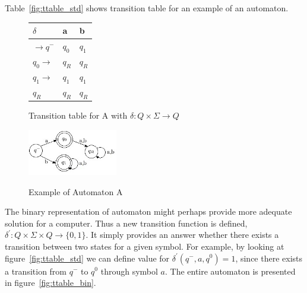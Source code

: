\documentclass{article}
\begin{document}
Table~\ref{fig:ttable_std} shows transition table for an example of an automaton.

%
%
\begin{figure}
\CenterFloatBoxes
\begin{floatrow}

\ttabbox
  {
  \centering
  \setlength{\tabcolsep}{15pt}
	\renewcommand{\arraystretch}{1.5}
	\begin{tabular}{|P{1.0cm} || P{0.6cm} | P{0.6cm} |}
	\hline
	$\delta$ & a & b \\
	\hline
	\hline
	$\rightarrow q^-$ 		& $q_0$ & $q_1$ \\
	\hline
	$q_0 \rightarrow$ 		& $q_R$ & $q_R$ \\
	\hline
	$q_1 \rightarrow$ 		& $q_1$ & $q_1$ \\
	\hline
	$q_R$  					& $q_R$ & $q_R$ \\
	\hline
	\end{tabular}
  }
  {\caption{Transition table for A with $\delta: Q \times \Sigma \rightarrow Q$}\label{fig:ttable_std}}

\ffigbox
  {\includegraphics[width=0.35\textwidth]{images/automaton_example.jpg}}
  {\caption{Example of Automaton A}\label{fig:automaton_ex}}
\killfloatstyle

\end{floatrow}
\end{figure}


The binary representation of automaton might perhaps provide more adequate solution for a computer. Thus a new transition function is defined, $\delta^{'}: Q \times \Sigma \times Q \rightarrow \{0,1\}$. It simply provides an answer whether there exists a transition between two states for a given symbol. For example, by looking at figure~\ref{fig:ttable_std} we can define value for $\delta^{'}(q^-,a,q^0) = 1$, since there exists a transition from $q^-$ to $q^0$ through symbol $a$. The entire automaton is presented in figure~\ref{fig:ttable_bin}.
\end{document}
